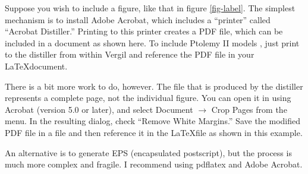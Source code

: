 \documentclass[10pt,twocolumn]{article}
\begin{document}
Suppose you wish to include a figure, like that in figure \ref{fig-label}.
The simplest mechanism is to install Adobe Acrobat, which includes
a ``printer'' called ``Acrobat Distiller.'' Printing to this printer
creates a PDF file, which can be included in a document as shown
here.  To include Ptolemy II models \cite{PtolemyVol1:04},
just print to the distiller from within Vergil and reference
the PDF file in your \LaTeX document.

There is a bit more work to do, however.
The file that is produced by the distiller represents
a complete page, not the individual figure.
You can open it in using Acrobat (version 5.0 or later),
and select Document $\rightarrow$ Crop Pages from the menu.
In the resulting dialog, check ``Remove White Margins.''
Save the modified PDF file in a file and then reference
it in the \LaTeX file as shown in this example.

An alternative is to generate EPS (encapsulated postscript),
but the process is much more complex and fragile.
I recommend using pdflatex and Adobe Acrobat.



\end{document}
